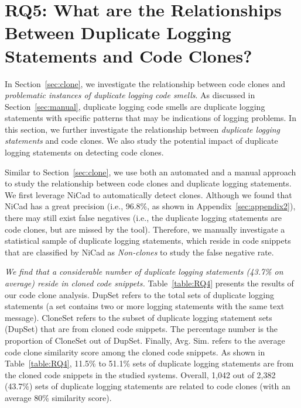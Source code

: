 
\section{RQ5: What are the Relationships Between Duplicate Logging Statements and Code Clones?}
\label{sec:rq5}


In Section~\ref{sec:clone}, we investigate the relationship between code clones and {\em problematic instances of duplicate logging code smells}. As discussed in Section~\ref{sec:manual}, duplicate logging code smells are duplicate logging statements with specific patterns that may be indications of logging problems. In this section, we further investigate the relationship between {\em duplicate logging statements} and code clones. We also study the potential impact of duplicate logging statements on detecting code clones. 


Similar to Section~\ref{sec:clone}, we use both an automated and a manual approach to study the relationship between code clones and duplicate logging statements. We first leverage NiCad to automatically detect clones. Although we found that NiCad has a great precision (i.e., 96.8\%, as shown in Appendix~\ref{sec:appendix2}), there may still exist false negatives (i.e., the duplicate logging statements are code clones, but are missed by the tool). Therefore, we manually investigate a statistical sample of duplicate logging statements, which reside in code snippets that are classified by NiCad as {\em Non-clones} to study the false negative rate. 


 {\em We find that a considerable number of duplicate logging statements (43.7\% on average) reside in cloned code snippets.}
Table~\ref{table:RQ4} presents the results of our code clone analysis. {\sf DupSet} refers to the total sets of duplicate logging statements (a set contains two or more logging statements with the same text message). {\sf CloneSet} refers to the subset of duplicate logging statement sets ({\sf DupSet}) that are from cloned code snippets. The percentage number is the proportion of {\sf CloneSet} out of {\sf DupSet}. Finally, {\sf Avg. Sim.} refers to the average code clone similarity score among the cloned code snippets. As shown in Table~\ref{table:RQ4}, 11.5\% to 51.1\% sets of duplicate logging statements are from the cloned code snippets in the studied systems. Overall, 1,042 out of 2,382 (43.7\%) sets of duplicate logging statements are related to code clones (with an average 80\% similarity score).

